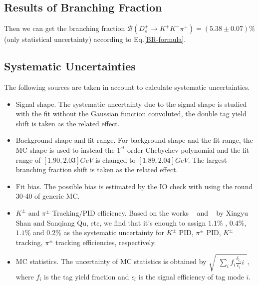 {    \subsection{Results of Branching Fraction}



    Then we can get the branching fraction $\mathcal{B}(D_{s}^{+} \rightarrow K^{+}K^{-}\pi^{+})=(5.38\pm0.07)\%$(only statistical uncertainty) according to Eq.\ref{BR-formula}.

    \subsection{Systematic Uncertainties}
    The following sources are taken in account to calculate systematic uncertainties.

    \begin{itemize}
        \item Signal shape. The systematic uncertainty due to the signal shape is studied with the fit without the Gaussian function convoluted, the double tag yield shift is taken as the related effect. 

        \item Background shape and fit range. For background shape and the fit range, the MC shape is used to instead the $1^{st}$-order Chebychev polynomial and the fit range of $[1.90, 2.03]GeV$ is changed to $[1.89, 2.04]GeV$. 
            The largest branching fraction shift is taken as the related effect.
        
        \item Fit bias. The possible bias is estimated by the IO check with using the round 30-40 of generic MC.
            
        \item $K^{\pm}$ and $\pi^{\pm}$ Tracking/PID efficiency. Based on the works ~\cite{PID} and ~\cite{Tracking} by Xingyu Shan and Sanqiang Qu, etc, 
            we find that it's enough to assign $1.1\%$ , $0.4\%$, $1.1\%$ and $0.2\%$ as the systematic uncertainty for $K^{\pm}$ PID, $\pi^{\pm}$ PID,  $K^{\pm}$ tracking, $\pi^{\pm}$ tracking efficiencies, respectively.
    
    \item MC statistics. The uncertainty of MC statistics is obtained by $\sqrt{ \begin{matrix} \sum_{i} f_{i}\frac{\delta_{\epsilon_{i}}}{\epsilon_{i}}i\end{matrix}}$, where $f_{i}$ is the tag yield fraction and $\epsilon_{i}$ is the signal efficiency of tag mode $i$.
    \end{itemize}

}
